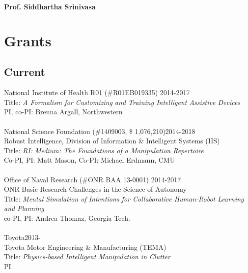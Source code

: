 \documentclass[10pt]{article}
\begin{document}
\pagestyle{empty} %

\par{\centering
		{\bf\LARGE Prof. Siddhartha Srinivasa
	}\bigskip\par}





\newpage






\section{Grants}

\subsection{Current}
\noindent
National Institute of Health R01 (\#R01EB019335) \hfill 2014-2017\\
Title: \textit{A Formalism for Customizing and Training Intelligent Assistive Devices}\\
PI, co-PI: Brenna Argall, Northwestern\\
\\
National Science Foundation (\#1409003, \$ 1,076,210)\hfill 2014-2018\\
Robust Intelligence, Division of Information \& Intelligent Systems (IIS)\\
Title: \textit{RI: Medium: The Foundations of a Manipulation Repertoire}\\
Co-PI, PI: Matt Mason, Co-PI: Michael Erdmann, CMU\\
\\
Office of Naval Research (\#ONR BAA 13-0001) \hfill 2014-2017\\
ONR Basic Research Challenges in the Science of Autonomy\\
Title: \textit{Mental Simulation of Intentions for Collaborative Human-Robot Learning and Planning}\\
co-PI, PI: Andrea Thomaz, Georgia Tech.	\\
\\
Toyota\hfill 2013-\\
Toyota Motor Engineering \& Manufacturing (TEMA)\\
Title: \textit{Physics-based Intelligent Manipulation in Clutter}\\
PI\\
\end{document}
